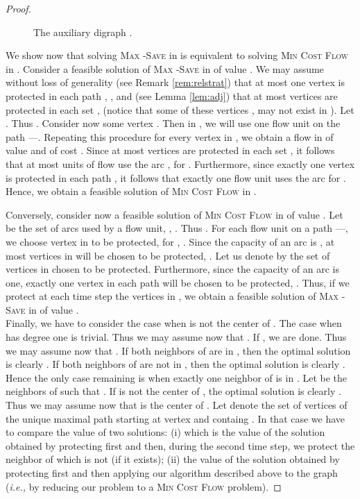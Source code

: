 \documentclass[10pt]{article}
\newcommand{\probtitle}[1]{\textsc{#1}}
\newcommand{\qedfill}[0]{ }
\begin{document}
\begin{proof}
\begin{figure}[!h]
\caption{The auxiliary digraph .}
\label{fig:mincostflow}

\end{figure}

We show now that solving \probtitle{Max -Save} in  is equivalent to solving \probtitle{Min Cost Flow} in . Consider a feasible solution of \probtitle{Max -Save} in  of value . We may assume without loss of generality (see Remark \ref{rem:relstrat}) that at most one vertex is protected in each path , , and (see Lemma \ref{lem:adj}) that at most  vertices are protected in each set ,  (notice that some of these vertices , may not exist in ). Let . Thus . Consider now some vertex . Then in , we will use one flow unit on the path ---. Repeating this procedure for every vertex in , we obtain a flow in  of value  and of cost . Since at most  vertices are protected in each set , it follows that at most  units of flow use the arc , for . Furthermore, since exactly one vertex is protected in each path , it follows that exactly one flow unit uses the arc  for . Hence, we obtain a feasible solution of \probtitle{Min Cost Flow} in .

Conversely, consider now a feasible solution of \probtitle{Min Cost Flow} in  of value . Let  be the set of arcs  used by a flow unit, , . Thus . For each flow unit on a path ---, we choose vertex  in  to be protected, for , . Since the capacity of an arc  is , at most  vertices in  will be chosen to be protected, . Let us denote by  the set of vertices in  chosen to be protected. Furthermore, since the capacity of an arc  is one, exactly one vertex in each path  will be chosen to be protected, . Thus, if we protect at each time step  the vertices in , we obtain a feasible solution of \probtitle{Max -Save} in  of value .\\

Finally, we have to consider the case when  is not the center of . The case when  has degree one is trivial. Thus we may assume now that . If , we are done. Thus we may assume now that . If both neighbors of  are in , then the optimal solution is clearly . If both neighbors of  are not in , then the optimal solution is clearly . Hence the only case remaining is when exactly one neighbor of  is in . Let  be the neighbors of  such that . If  is not the center of , the optimal solution is clearly . Thus we may assume now that  is the center of . Let  denote the set of vertices of the unique maximal path starting at vertex  and containg . In that case we have to compare the value of two solutions: (i)  which is the value of the solution obtained by protecting first  and then, during the second time step, we protect the neighbor of  which is not  (if it exists); (ii) the value of the solution obtained by protecting first  and then applying our algorithm described above to the graph  (\textit{i.e.,} by reducing our problem to a \probtitle{Min Cost Flow} problem).\qedfill
\end{proof}
\end{document}
